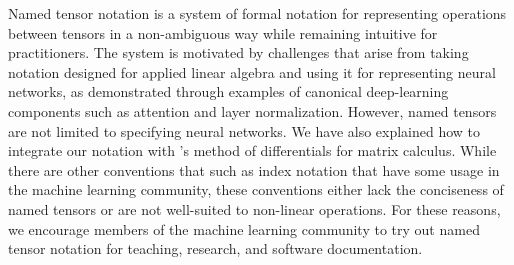 Named tensor notation is a system of formal notation for representing operations between tensors in a non-ambiguous way while remaining intuitive for practitioners. The system is motivated by challenges that arise from taking notation designed for applied linear algebra and using it for representing neural networks, as demonstrated through examples of canonical deep-learning components such as attention and layer normalization. However, named tensors are not limited to specifying neural networks. We have also explained how to integrate our notation with \citet{magnus+neudecker:1985}'s method of differentials for matrix calculus. While there are other conventions that such as index notation that have some usage in the machine learning community, these conventions either lack the conciseness of named tensors or are not well-suited to non-linear operations. For these reasons, we encourage members of the machine learning community to try out named tensor notation for teaching, research, and software documentation.